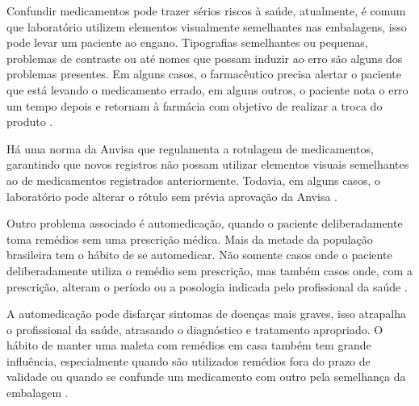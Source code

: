 Confundir medicamentos pode trazer sérios riscos à saúde, atualmente, é comum que laboratório utilizem elementos visualmente semelhantes nas embalagens, isso pode levar um paciente ao engano.
Tipografias semelhantes ou pequenas, problemas de contraste ou até nomes que possam induzir ao erro são alguns dos problemas presentes.
Em alguns casos, o farmacêutico precisa alertar o paciente que está levando o medicamento errado, em alguns outros, o paciente nota o erro um tempo depois e retornam à farmácia com objetivo de realizar a troca do produto \cite{ione2017}.

Há uma norma da \ac{Anvisa} que regulamenta a rotulagem de medicamentos, garantindo que novos registros não possam utilizar elementos visuais semelhantes ao de medicamentos registrados anteriormente.
Todavia, em alguns casos, o laboratório pode alterar o rótulo sem prévia aprovação da \ac{Anvisa} \cite{ione2017}.

Outro problema associado é automedicação, quando o paciente deliberadamente toma remédios sem uma prescrição médica.
Mais da metade da população brasileira tem o hábito de se automedicar.
Não somente casos onde o paciente deliberadamente utiliza o remédio sem prescrição, mas também casos onde, com a prescrição, alteram o período ou a posologia indicada pelo profissional da saúde \cite{crfsp2019}.

A automedicação pode disfarçar sintomas de doenças mais graves, isso atrapalha o profissional da saúde, atrasando o diagnóstico e tratamento apropriado.
O hábito de manter uma maleta com remédios em casa também tem grande influência, especialmente quando são utilizados remédios fora do prazo de validade ou quando se confunde um medicamento com outro pela semelhança da embalagem \cite{g12019}.






